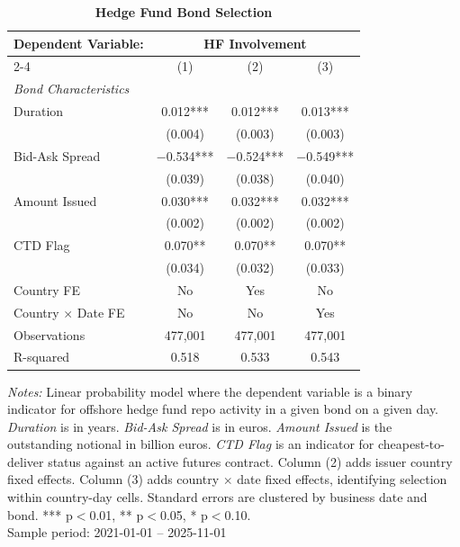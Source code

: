 \documentclass[english, 11pt, oneside]{article}
\begin{document}
\begin{table}[t]
\centering
\caption{\textbf{Hedge Fund Bond Selection}}
\footnotesize
\setlength{\tabcolsep}{12pt}
\renewcommand{\arraystretch}{1.1}
\begin{tabular}{l c c c}
\toprule
\textbf{Dependent Variable:} & \multicolumn{3}{c}{\textbf{HF Involvement}} \\
\cmidrule(lr){2-4}
 & (1) & (2) & (3) \\
\midrule
\textit{Bond Characteristics} & & & \\
Duration & 0.012*** & 0.012*** & 0.013*** \\
 & (0.004) & (0.003) & (0.003) \\
Bid-Ask Spread & $-$0.534*** & $-$0.524*** & $-$0.549*** \\
 & (0.039) & (0.038) & (0.040) \\
Amount Issued & 0.030*** & 0.032*** & 0.032*** \\
 & (0.002) & (0.002) & (0.002) \\
CTD Flag & 0.070** & 0.070** & 0.070** \\
 & (0.034) & (0.032) & (0.033) \\
\midrule
Country FE & No & Yes & No \\
Country $\times$ Date FE & No & No & Yes \\
\midrule
Observations & 477,001 & 477,001 & 477,001 \\
R-squared & 0.518 & 0.533 & 0.543 \\
\bottomrule
\end{tabular}
\label{tab:hf_selection}

\vspace{1ex}
\raggedright\scriptsize
\textit{Notes:} Linear probability model where the dependent variable is a binary indicator for offshore hedge fund repo activity in a given bond on a given day. \textit{Duration} is in years. \textit{Bid-Ask Spread} is in euros. \textit{Amount Issued} is the outstanding notional in billion euros. \textit{CTD Flag} is an indicator for cheapest-to-deliver status against an active futures contract. Column (2) adds issuer country fixed effects. Column (3) adds country $\times$ date fixed effects, identifying selection within country-day cells. Standard errors are clustered by business date and bond. *** p$<$0.01, ** p$<$0.05, * p$<$0.10. \\ Sample period: 2021-01-01 -- 2025-11-01
\end{table}
\end{document}
